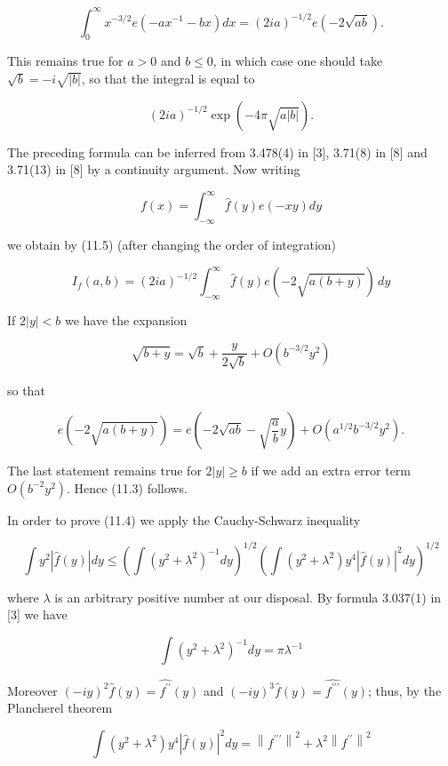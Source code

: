 \documentclass[10pt]{article}
\begin{document}
\begin{equation*}
\int_{0}^{\infty} x^{-3 / 2} e\left(-a x^{-1}-b x\right) d x=(2 i a)^{-1 / 2} e(-2 \sqrt{a b}) . \tag{11.5}
\end{equation*}


This remains true for $a>0$ and $b \leqslant 0$, in which case one should take $\sqrt{b}=-i\sqrt{|b|}$, so that the integral is equal to

$$
(2 i a)^{-1 / 2} \exp (-4 \pi \sqrt{a|b|}) .
$$

The preceding formula can be inferred from 3.478(4) in [3], 3.71(8) in [8] and 3.71(13) in [8] by a continuity argument. Now writing

$$
f(x)=\int_{-\infty}^{\infty} \hat{f}(y) e(-x y) d y
$$

we obtain by (11.5) (after changing the order of integration)

$$
I_{f}(a, b)=(2 i a)^{-1 / 2} \int_{-\infty}^{\infty}\widehat f(y)e(-2\sqrt{a(b+y)})\,dy
$$

If $2|y|<b$ we have the expansion

$$
\sqrt{b+y}=\sqrt{b}+\frac{y}{2 \sqrt{b}}+O\left(b^{-3 / 2} y^{2}\right)
$$

so that

$$
e(-2 \sqrt{a(b+y)})=e\left(-2 \sqrt{a b}-\sqrt{\frac{a}{b}} y\right)+O\left(a^{1 / 2} b^{-3 / 2} y^{2}\right) .
$$

The last statement remains true for $2|y| \geqslant b$ if we add an extra error term $O\left(b^{-2} y^{2}\right)$. Hence (11.3) follows.

In order to prove (11.4) we apply the Cauchy-Schwarz inequality

$$
\int y^{2}|\hat{f}(y)| d y \leqslant\left(\int\left(y^{2}+\lambda^{2}\right)^{-1} d y\right)^{1 / 2}\left(\int\left(y^{2}+\lambda^{2}\right) y^{4}|\hat{f}(y)|^{2} d y\right)^{1 / 2}
$$

where $\lambda$ is an arbitrary positive number at our disposal. By formula 3.037(1) in [3] we have

$$
\int\left(y^{2}+\lambda^{2}\right)^{-1} d y=\pi \lambda^{-1}
$$

Moreover $(-iy)^{2}\widehat f(y)=\widehat{f^{\prime\prime}}(y)$ and $(-iy)^{3}\widehat f(y)=\widehat{f^{\prime\prime\prime}}(y)$; thus, by the Plancherel theorem

$$
\int\left(y^{2}+\lambda^{2}\right) y^{4}|\hat{f}(y)|^{2} d y=\left\|f^{\prime \prime \prime}\right\|^{2}+\lambda^{2}\left\|f^{\prime \prime}\right\|^{2}
$$
\end{document}
